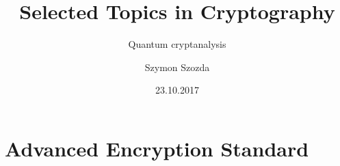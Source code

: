 \documentclass[compress]{beamer} %
\title{Selected Topics in Cryptography}
\subtitle{Quantum cryptanalysis}
\author[]{Szymon Szozda}
\institute[KT AGH]{Department of Telecommunications}
\date{23.10.2017}
\begin{document}
	\begin{frame}
    	\titlepage
	\end{frame}


\renewcommand{\logosinfootline}{\raisebox{0.12cm}{\begin{beamercolorbox}{rafi}{Selected Topics in Cryptography \quad \insertframenumber/\inserttotalframenumber}\end{beamercolorbox}}}
\section{Advanced Encryption Standard} 


 

\end{document}
